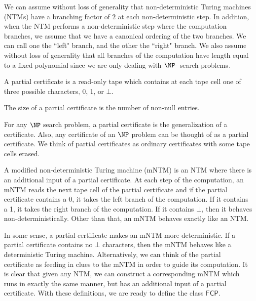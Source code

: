 \documentclass[runningheads,a4paper]{llncs}
\begin{document}
We can assume without loss of generality that non-deterministic Turing machines (NTMs) have a branching factor of $2$ at each non-deterministic step. In addition, when the NTM performs a non-deterministic step where the computation branches, we assume that we have a canonical ordering of the two branches. We can call one the ``left" branch, and the other the ``right" branch. We also assume without loss of generality that all branches of the computation have length equal to a fixed polynomial since we are only dealing with $\NP$- search problems.

\begin{definition}
A partial certificate is a read-only tape which contains at each tape cell one of three possible characters, 0, 1, or $\bot$.
\end{definition}

\begin{definition}
The size of a partial certificate is the number of non-null entries. 
\end{definition}

For any $\NP$ search problem, a partial certificate is the generalization of a certificate. Also, any certificate of an $\NP$ problem can be thought of as a partial certificate. We think of partial certificates as ordinary certificates with some tape cells erased.

\begin{definition}
A modified non-deterministic Turing machine (mNTM) is an NTM where there is an additional input of a partial certificate. At each step of the computation, an mNTM reads the next tape cell of the partial certificate and if the partial certificate contains a 0, it takes the left branch of the computation. If it contains a 1, it takes the right branch of the computation. If it contains $\bot$, then it behaves non-deterministically. Other than that, an mNTM behaves exactly like an NTM.
\end{definition}

In some sense, a partial certificate makes an mNTM more deterministic. If a partial certificate contains no $\bot$ characters, then the mNTM behaves like a deterministic Turing machine. Alternatively, we can think of the partial certificate as feeding in clues to the mNTM in order to guide its computation. It is clear that given any NTM, we can construct a corresponding mNTM which runs in exactly the same manner, but has an additional input of a partial certificate. With these definitions, we are ready to define the class $\mathsf{FCP}$.
\end{document}
